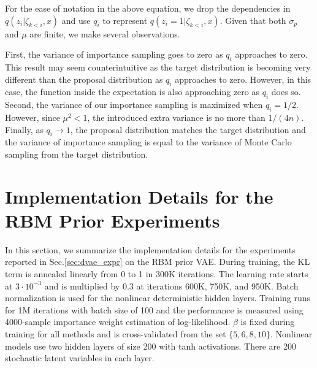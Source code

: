 \documentclass{article}
\begin{document}
For the ease of notation in the above equation, we drop the dependencies in $q(z_i|\zeta_{k<i},x)$ and use $q_i$ to represent $q(z_i=1|\zeta_{k<i},x)$. Given that both $\sigma_p$ and $\mu$ are finite, we make several observations.

First, the variance of importance sampling goes to zero as $q_i$ approaches to zero.
This result may seem counterintuitive as the target distribution is becoming very different than the proposal distribution as $q_i$ approaches to zero. However,
in this case, the function inside the expectation is also approaching zero as $q_i$ does so. Second, the variance of our importance sampling is maximized when $q_i = 1/2$.
However, since $\mu^2 < 1$, the introduced extra variance is no more than ${1/(4n)}$. Finally, as $q_i \rightarrow 1$, the proposal distribution
matches the target distribution and the variance of importance sampling is equal to the variance of Monte Carlo sampling from the target distribution.

\fi

\section{Implementation Details for the RBM Prior Experiments} \label{app:rbm_details}

In this section, we summarize the implementation details for the experiments reported in Sec.\ref{sec:dvae_expr} on the RBM prior VAE. 
During training, the KL term is annealed linearly from 0 to 1 in 300K iterations. The learning rate starts at $3\cdot 10^{-3}$ and is multiplied by 
0.3 at iterations 600K, 750K, and 950K. 
Batch normalization is used for the nonlinear deterministic hidden layers. Training runs for 1M iterations 
with batch size of 100 and the performance is measured using 4000-sample importance weight estimation of log-likelihood. 
$\beta$ is fixed during training for all methods and is cross-validated from the set $\{5,6,8,10\}$. 
Nonlinear models use two hidden layers of size 200 with tanh activations. 
There are 200 stochastic latent variables in each layer. 
\end{document}
